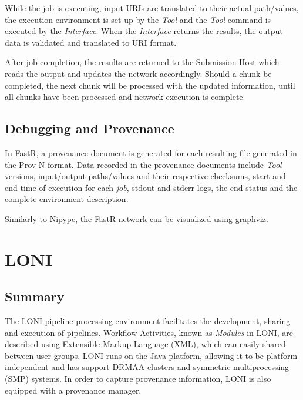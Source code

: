 \documentclass{report}
\begin{document}
While the job is executing, input URIs are translated to their actual path/values,
the execution environment is set up by the \textit{Tool} and the \textit{Tool}
command is executed by the \textit{Interface}. When the \textit{Interface}
returns the results, the
output data is validated and translated to URI format. 

After job completion, the results are returned to the Submission Host which
reads the output and updates the network accordingly. Should a chunk be
completed, the next chunk will be processed with the updated information, until
all chunks have been processed and network execution is complete.

        \subsection{Debugging and Provenance}
        In FastR, a provenance document is generated for each resulting file
generated in the Prov-N format. Data recorded in the provenance documents include \textit{Tool}
versions, input/output paths/values and their respective checksums, start and
end time of execution for each \textit{job}, stdout and stderr logs, the end
status and the complete environment description.

    Similarly to Nipype, the FastR network can be visualized using graphviz.

         

    \section{LONI}
        \subsection{Summary}
        The LONI pipeline processing environment facilitates the development,
sharing and execution of pipelines. Workflow Activities, known as \textit{Modules} in
LONI, are described using Extensible Markup Language (XML), which can easily
shared between user groups. LONI runs on the Java platform, allowing it to be
platform independent and has support DRMAA clusters and symmetric
multiprocessing (SMP) systems. In order to
capture provenance information, LONI is also equipped with a provenance manager.
  
\end{document}
